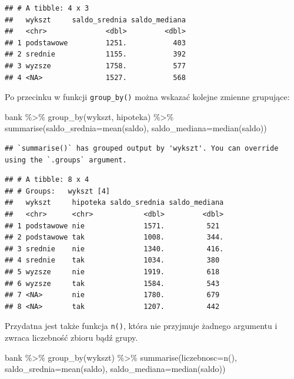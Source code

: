 \documentclass[
]{book}
\newenvironment{Shaded}{\begin{snugshade}}{\end{snugshade}}
\newcommand{\AttributeTok}[1]{\textcolor[rgb]{0.77,0.63,0.00}{#1}}
\newcommand{\FunctionTok}[1]{\textcolor[rgb]{0.00,0.00,0.00}{#1}}
\newcommand{\NormalTok}[1]{#1}
\newcommand{\SpecialCharTok}[1]{\textcolor[rgb]{0.00,0.00,0.00}{#1}}
\begin{document}
\begin{verbatim}
## # A tibble: 4 x 3
##   wykszt     saldo_srednia saldo_mediana
##   <chr>              <dbl>         <dbl>
## 1 podstawowe         1251.           403
## 2 srednie            1155.           392
## 3 wyzsze             1758.           577
## 4 <NA>               1527.           568
\end{verbatim}

Po przecinku w funkcji \texttt{group\_by()} można wskazać kolejne zmienne grupujące:

\begin{Shaded}
\begin{Highlighting}[]
\NormalTok{bank }\SpecialCharTok{\%\textgreater{}\%}
  \FunctionTok{group\_by}\NormalTok{(wykszt, hipoteka) }\SpecialCharTok{\%\textgreater{}\%}
  \FunctionTok{summarise}\NormalTok{(}\AttributeTok{saldo\_srednia=}\FunctionTok{mean}\NormalTok{(saldo),}
            \AttributeTok{saldo\_mediana=}\FunctionTok{median}\NormalTok{(saldo))}
\end{Highlighting}
\end{Shaded}

\begin{verbatim}
## `summarise()` has grouped output by 'wykszt'. You can override using the `.groups` argument.
\end{verbatim}

\begin{verbatim}
## # A tibble: 8 x 4
## # Groups:   wykszt [4]
##   wykszt     hipoteka saldo_srednia saldo_mediana
##   <chr>      <chr>            <dbl>         <dbl>
## 1 podstawowe nie              1571.          521 
## 2 podstawowe tak              1008.          344.
## 3 srednie    nie              1340.          416.
## 4 srednie    tak              1034.          380 
## 5 wyzsze     nie              1919.          618 
## 6 wyzsze     tak              1584.          543 
## 7 <NA>       nie              1780.          679 
## 8 <NA>       tak              1207.          442
\end{verbatim}

Przydatna jest także funkcja \texttt{n()}, która nie przyjmuje żadnego argumentu i zwraca liczebność zbioru bądź grupy.

\begin{Shaded}
\begin{Highlighting}[]
\NormalTok{bank }\SpecialCharTok{\%\textgreater{}\%}
  \FunctionTok{group\_by}\NormalTok{(wykszt) }\SpecialCharTok{\%\textgreater{}\%}
  \FunctionTok{summarise}\NormalTok{(}\AttributeTok{liczebnosc=}\FunctionTok{n}\NormalTok{(),}
            \AttributeTok{saldo\_srednia=}\FunctionTok{mean}\NormalTok{(saldo),}
            \AttributeTok{saldo\_mediana=}\FunctionTok{median}\NormalTok{(saldo))}
\end{Highlighting}
\end{Shaded}
\end{document}
